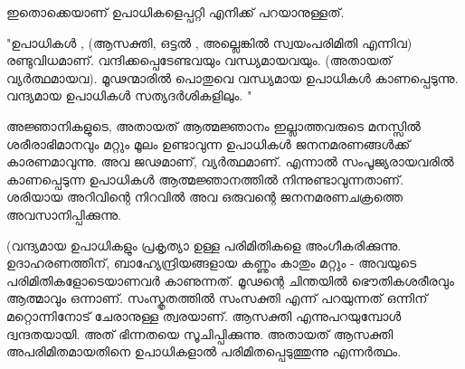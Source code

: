 ഇതൊക്കെയാണ് ഉപാധികളെപ്പറ്റി എനിക്ക് പറയാനുള്ളത്.

"ഉപാധികള്‍ , (ആസക്തി, ഒട്ടല്‍ , അല്ലെങ്കില്‍ സ്വയംപരിമിതി എന്നിവ) രണ്ടുവിധമാണ്. വന്ദിക്കപ്പെടേണ്ടവയും വന്ധ്യമായവയും.  (അതായത് വ്യര്‍ത്ഥമായവ). മൂഢന്മാരില്‍ പൊതുവെ വന്ധ്യമായ ഉപാധികള്‍   കാണപ്പെടുന്നു. വന്ദ്യമായ ഉപാധികള്‍  സത്യദര്‍ശികളിലും. "    

അജ്ഞാനികളുടെ, അതായത് ആത്മജ്ഞാനം ഇല്ലാത്തവരുടെ മനസ്സില്‍ ശരീരാഭിമാനവും മറ്റും മൂലം ഉണ്ടാവുന്ന ഉപാധികള്‍ ജനനമരണങ്ങള്‍ക്ക് കാരണമാവുന്നു. അവ ജഢമാണ്, വ്യര്‍ത്ഥമാണ്. എന്നാല്‍ സംപൂജ്യരായവരില്‍ കാണപ്പെടുന്ന ഉപാധികള്‍ ആത്മജ്ഞാനത്തില്‍ നിന്നുണ്ടാവുന്നതാണ്. ശരിയായ അറിവിന്റെ നിറവില്‍ അവ ഒരുവന്റെ ജനനമരണചക്രത്തെ അവസാനിപ്പിക്കുന്നു.

(വന്ദ്യമായ ഉപാധികളും പ്രകൃത്യാ ഉള്ള പരിമിതികളെ അംഗീകരിക്കുന്നു. ഉദാഹരണത്തിന്, ബാഹ്യേന്ദ്രിയങ്ങളായ കണ്ണും കാതും മറ്റും - അവയുടെ പരിമിതികളോടെയാണവര്‍ കാണുന്നത്. മൂഢന്റെ ചിന്തയില്‍ ഭൌതികശരീരവും ആത്മാവും ഒന്നാണ്. സംസ്കൃതത്തില്‍ സംസക്തി എന്ന് പറയുന്നത് ഒന്നിന് മറ്റൊന്നിനോട് ചേരാനുള്ള ത്വരയാണ്. ആസക്തി എന്നുപറയുമ്പോള്‍ ദ്വന്ദതയായി. അത് ഭിന്നതയെ സൂചിപ്പിക്കുന്നു. അതായത് ആസക്തി അപരിമിതമായതിനെ ഉപാധികളാല്‍ പരിമിതപ്പെടുത്തുന്നു എന്നര്‍ത്ഥം.

